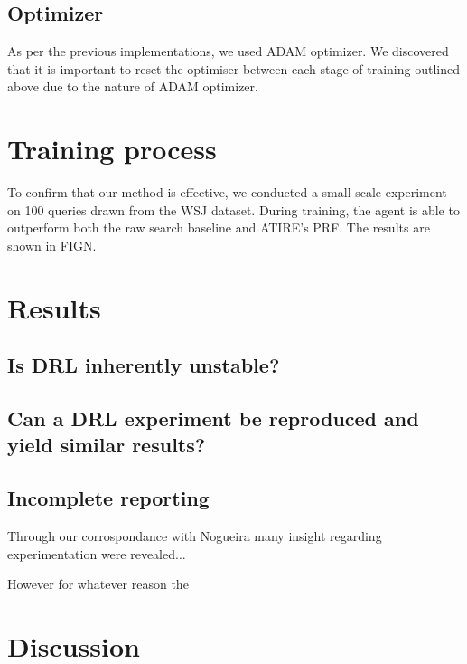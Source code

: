 \subsection{Optimizer}
As per the previous implementations, we used ADAM optimizer. We discovered that it is important to reset the optimiser between each stage of training outlined above due to the nature of ADAM optimizer. 




\section{Training process}








To confirm that our method is effective, we conducted a small scale experiment on 100 queries drawn from the WSJ dataset. During training, the agent is able to outperform both the raw search baseline and ATIRE’s PRF. The results are shown in FIGN.










\section{Results }


\subsection{Is DRL inherently unstable?}

\subsection{Can a DRL experiment be reproduced and yield similar results?}


\subsection{Incomplete reporting}

Through our corrospondance with Nogueira many insight regarding experimentation were revealed...

However for whatever reason the 


\section{Discussion}



